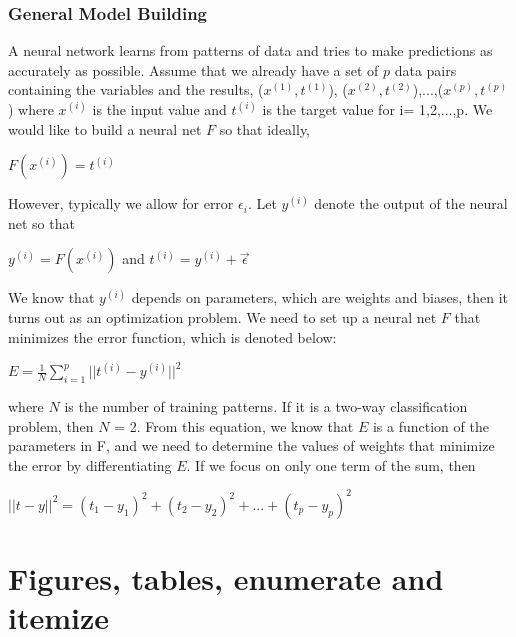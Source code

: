 \documentclass[a4paper,11pt,oneside]{book}
\begin{document}
\subsection{General Model Building}
A neural network learns from patterns of data and tries to make predictions as accurately as possible. Assume that we already have a
set of $p$ data pairs containing the variables and the results, ($x^{(1)},t^{(1)}$), ($x^{(2)},t^{(2)}$),...,($x^{(p)},t^{(p)}$) where $x^{(i)}$ is the input value and $t^{(i)}$ is the target value for i= 1,2,...,p. We would like to build a neural net $F$ so that ideally, 
\begin{center}
$F(x^{(i)})=t^{(i)}$
\end{center}
However, typically we allow for error $\epsilon_i$. Let $y^{(i)}$ denote the output of the neural net so that

\begin{center}
	$y^{(i)}=F(x^{(i)})$ and $t^{(i)}=y^{(i)}+\overrightarrow{\epsilon}$
\end{center}
We know that $y^{(i)}$ depends on parameters, which are weights and biases,
then it turns out as an optimization problem. We need to set up a neural net $F$ that minimizes the error function, which is denoted below:
\begin{center}
	$E = \frac{1}{N}\sum_{i=1}^{p}||t^{(i)}-y^{(i)}||^2$ 
\end{center}
where $N$ is the number of training patterns. If it is a two-way classification problem, then $N$ = 2. From this equation, we know that $E$ is a
function of the parameters in F, and we need to determine the values
of weights that minimize the error by differentiating $E$.
If we focus on only one term of the sum, then
\begin{center}
	$||t-y||^2=(t_{1}-y_{1})^2+(t_{2}-y_{2})^2+...+(t_{p}-y_{p})^2$ 
\end{center}










\chapter{Figures, tables, enumerate and itemize}
\end{document}
